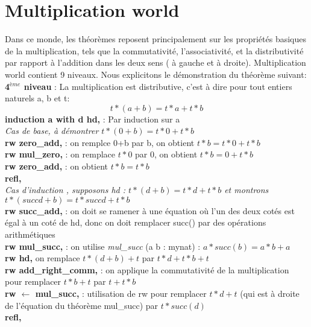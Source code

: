 \documentclass{article}
\begin{document}
\section{Multiplication world}
Dans ce monde, les théorèmes reposent principalement sur les propriétés basiques de la multiplication, tels que la commutativité, l'associativité, et la distributivité par rapport à l'addition dans les deux sens ( à gauche et à droite). Multiplication world contient 9 niveaux. Nous explicitons le démonstration du théorème suivant: \\

\textbf{4$^{ème}$ niveau }: La multiplication est distributive, c'est à dire pour tout entiers naturels a, b et t: $$t*(a+b)=t*a+t*b$$
\textbf{induction a with d hd,} : Par induction sur a\\
\textit{Cas de base, à démontrer $t * (0 + b) = t * 0 + t * b$}\\
\textbf{rw zero\_add,} : on remplce 0+b par b, on obtient $t * b = t * 0 + t * b$ \\
\textbf{rw mul\_zero,} : on remplace $t*0$ par 0, on obtient $t * b = 0 + t * b$ \\
\textbf{rw zero\_add,} : on obtient $t * b = t * b$ \\
\textbf{refl,} \\
\textit{Cas d'induction , supposons hd : $t * (d + b) = t * d + t * b$ et montrons $t * (succ d + b) = t * succ d + t * b$ }\\
\textbf{rw succ\_add,} : on doit se ramener à une équation où l'un des deux cotés est égal à un coté de hd, donc on doit remplacer succ() par des opérations arithmétiques\\
\textbf{rw mul\_succ,} : on utilise \textit{mul\_succ} (a b : mynat) : $a * succ(b) = a * b + a $\\
\textbf{rw hd,} on remplace $t * (d + b) + t$ par $t * d + t * b+t$\\
\textbf{rw add\_right\_comm,} : on applique la commutativité de la multiplication pour remplacer $t * b + t$ par $ t + t * b$\\
\textbf{rw $\leftarrow$  mul\_succ, }: utilisation de rw \leftarrow pour remplacer $t * d + t$ (qui est à droite de l'équation du théorème mul\_succ) par $t * succ (d)$ \\
\textbf{refl,} \\
\end{document}
